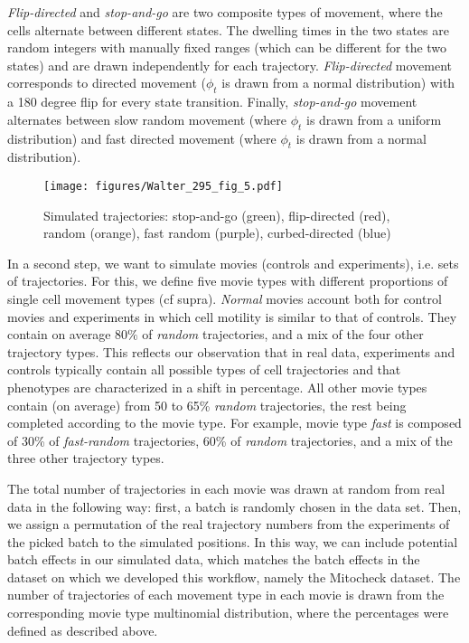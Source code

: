 \textit{Flip-directed} and \textit{stop-and-go} are two composite types of movement, where the cells
alternate between different states. The dwelling times in the two
states are random integers with manually fixed ranges (which can be
different for the two states) and are drawn independently for each
trajectory. \textit{Flip-directed} movement corresponds to directed
movement ($\phi_t$ is drawn from a normal distribution) with a 180
degree flip for every state transition. Finally, \textit{stop-and-go}
movement alternates between slow random movement (where $\phi_t$ is
drawn from a uniform distribution)  and fast directed
movement (where $\phi_t$ is drawn from a normal distribution).  
\begin{figure}[ht]
\centering
\texttt{[image: figures/Walter\_295\_fig\_5.pdf]}
\caption{Simulated trajectories: stop-and-go (green), flip-directed
  (red), random (orange), fast random (purple), curbed-directed (blue)}
\label{simulation}
\end{figure}

In a second step, we want to simulate movies (controls and experiments), i.e. sets of
trajectories. For this, we define five movie types with different
proportions of single cell movement types (cf supra). \textit{Normal}
movies account both for 
control movies and experiments in which cell motility is similar to
that of controls. They contain on average $80\%$ of \textit{random} trajectories,
and a mix of the four other trajectory types. This reflects our
observation that in real data, experiments and controls typically contain all possible types
of cell trajectories and that phenotypes are characterized in a shift
in percentage. All other movie types contain (on average) from 50 to 65\%
\textit{random} trajectories, the rest being completed according to
the movie type. For example, movie type \textit{fast} is composed of 30\% of
\textit{fast-random} trajectories, 60\% of \textit{random}
trajectories, and a mix of the three other trajectory types. 

The total number of trajectories in each movie was drawn at random
from real data in the following way: first, a batch is randomly chosen in the data
set. Then, we assign a permutation of the real trajectory numbers from
the experiments of the picked batch to the simulated positions. In this way, we can include potential batch effects in our simulated data, which matches the batch effects in the dataset on which we developed this workflow, namely the Mitocheck dataset. The number of trajectories of each movement type in each movie is drawn from
the corresponding movie type multinomial distribution, where the
percentages were defined as described above. 

